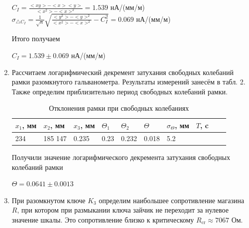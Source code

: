 \documentclass[a4paper]{article}
\begin{document}
\begin{enumerate}
          \begin{center}
              $C_I = \frac{<xy>-<x><y>}{<x^2>-<x>^2} = 1.539$ нА/(мм/м)\\

              $\sigma_{\triangle C_I} = \frac{1}{\sqrt{n}} \sqrt{\frac{<y^2>-<y>^2}{<x^2>-<x>^2} - C_I^2} = 0.069$ нА/(мм/м)
          \end{center}

          Итого получаем
          \begin{center}
              $C_I = 1.539 \pm 0.069$ нА/(мм/м)
          \end{center}

    \item Рассчитаем логарифмический декремент затухания свободных колебаний рамки разомкнутого гальванометра. Результаты измерений занесём в табл. 2. Также определим приблизительно период свободных колебаний рамки.

          \begin{table}[H]
              \centering
              \begin{center}
                  \caption{Отклонения рамки при свободных колебаниях}
              \end{center}
              \vspace{0.1cm}
              \label{tab:my_label}
              \begin{tabular}{ |p{1.2cm}|p{1.2cm}|p{1.2cm}|p{1.2cm}|p{1.2cm}|p{1.2cm}|p{1.2cm}|p{1.2cm}|p{1.2cm}|p{1.2cm}|}
                  \hline
                  $x_1$, мм & $x_2$, мм & $x_3$, мм & $\Theta_1$ & $\Theta_2$ & $\Theta$ & $\sigma_\Theta$, мм & $T$, c \\
                  \hline
                  234       & 185 147   & 0.235     & 0.23       & 0.232      & 0.018    & 5.2                          \\
                  \hline
              \end{tabular}
          \end{table}

          Получили значение логарифмического декремента затухания свободных колебаний рамки
          \begin{center}
              $\Theta = 0.0641 \pm 0.0013$
          \end{center}

    \item При разомкнутом ключе $K_3$ определим наибольшее сопротивление магазина $R$, при котором при размыкании ключа зайчик не переходит за нулевое значение шкалы. Это сопротивление близко к критическому $R_\text{cr} \approx 7067$ Ом.


\end{enumerate}
\end{document}
